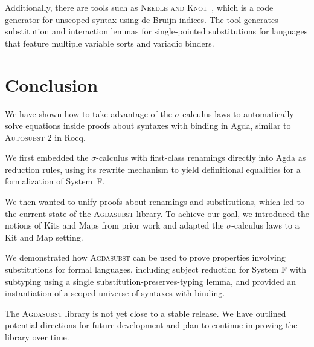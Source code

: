 \documentclass[screen,nonacm]{acmart}
\begin{document}
Additionally, there are tools such as \textsc{Needle and
      Knot}~\cite{10.1007/978-3-662-49498-1_17}, which is a code generator for
unscoped syntax using de Bruijn indices. The tool generates substitution and
interaction lemmas for single-pointed substitutions for languages that feature
multiple variable sorts and variadic binders.

\section{Conclusion}\label{sec:con}
We have shown how to take advantage of the $σ$-calculus laws to automatically
solve equations inside proofs about syntaxes with binding in Agda, similar to
\textsc{Autosubst 2} in Rocq.

We first embedded the $σ$-calculus with first-class renamings directly into
Agda as reduction rules, using its rewrite mechanism to yield definitional
equalities for a formalization of System~F.

We then wanted to unify proofs about renamings and substitutions, which led to
the current state of the \textsc{Agdasubst} library. To achieve our goal, we
introduced the notions of Kits and Maps from prior work and adapted the
$σ$-calculus laws to a Kit and Map setting.

We demonstrated how \textsc{Agdasubst} can be used to prove properties
involving substitutions for formal languages, including subject reduction for
System F with subtyping using a single substitution-preserves-typing lemma, and
provided an instantiation of a scoped universe of syntaxes with binding.

The \textsc{Agdasubst} library is not yet close to a stable release. We have
outlined potential directions for future development and plan to continue
improving the library over time.



\end{document}
